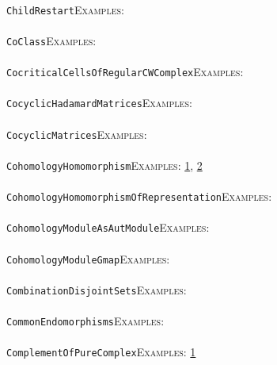 \documentclass[a4paper,11pt]{report}
\begin{document}
{{ \\
 \texttt{ChildRestart}{\nobreakspace}{\nobreakspace}{\nobreakspace}{\nobreakspace}\textsc{Examples:} \\
 \\
 \texttt{CoClass}{\nobreakspace}{\nobreakspace}{\nobreakspace}{\nobreakspace}\textsc{Examples:} \\
 \\
 \texttt{CocriticalCellsOfRegularCWComplex}{\nobreakspace}{\nobreakspace}{\nobreakspace}{\nobreakspace}\textsc{Examples:} \\
 \\
 \texttt{CocyclicHadamardMatrices}{\nobreakspace}{\nobreakspace}{\nobreakspace}{\nobreakspace}\textsc{Examples:} \\
 \\
 \texttt{CocyclicMatrices}{\nobreakspace}{\nobreakspace}{\nobreakspace}{\nobreakspace}\textsc{Examples:} \\
 \\
 \texttt{CohomologyHomomorphism}{\nobreakspace}{\nobreakspace}{\nobreakspace}{\nobreakspace}\textsc{Examples:} \href{tutorial/chap10.html} {1}{\nobreakspace}, \href{../www/SideLinks/About/aboutCoefficientSequence.html} {2}{\nobreakspace} \\
 \\
 \texttt{CohomologyHomomorphismOfRepresentation}{\nobreakspace}{\nobreakspace}{\nobreakspace}{\nobreakspace}\textsc{Examples:} \\
 \\
 \texttt{CohomologyModule{\textunderscore}AsAutModule}{\nobreakspace}{\nobreakspace}{\nobreakspace}{\nobreakspace}\textsc{Examples:} \\
 \\
 \texttt{CohomologyModule{\textunderscore}Gmap}{\nobreakspace}{\nobreakspace}{\nobreakspace}{\nobreakspace}\textsc{Examples:} \\
 \\
 \texttt{CombinationDisjointSets}{\nobreakspace}{\nobreakspace}{\nobreakspace}{\nobreakspace}\textsc{Examples:} \\
 \\
 \texttt{CommonEndomorphisms}{\nobreakspace}{\nobreakspace}{\nobreakspace}{\nobreakspace}\textsc{Examples:} \\
 \\
 \texttt{ComplementOfPureComplex}{\nobreakspace}{\nobreakspace}{\nobreakspace}{\nobreakspace}\textsc{Examples:} \href{../www/SideLinks/About/aboutPeripheral.html} {1}{\nobreakspace} \\
}}
\end{document}
